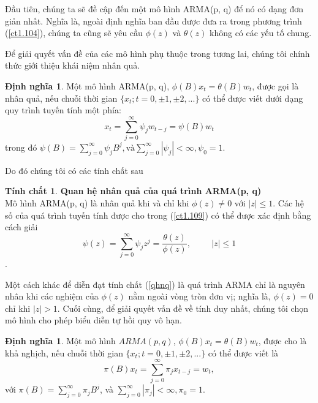\documentclass[12pt, a4paper,oneside]{book}
\theoremstyle{definition}
\newtheorem{dn}[theo]{Định nghĩa}
\newtheorem{tc}[theo]{Tính chất}
\begin{document}
Đầu tiên, chúng ta sẽ đề cập đến một mô hình ARMA(p, q) để nó có dạng đơn giản nhất. Nghĩa là, ngoài định nghĩa ban đầu được đưa ra trong phương trình (\ref{ct1.104}), chúng ta cũng sẽ yêu cầu $\phi(z)$ và $\theta(z)$ không có các yếu tố chung.
	
Để giải quyết vấn đề của các mô hình phụ thuộc trong tương lai, chúng tôi chính thức giới thiệu khái niệm nhân quả.

\begin{dn}
Một mô hình ARMA(p, q), $\phi(B)x_{t} = \theta(B)w_{t}$, được gọi là nhân quả, nếu chuỗi thời gian $\{x_{t}; t = 0, \pm 1, \pm 2, ...\}$ có thể được viết dưới dạng quy trình tuyến tính một phía:
\begin{equation}
x_{t}= \sum_{j=0}^{\infty}\psi_{j}w_{t-j}= \psi(B)w_{t} \label{ct1.109}
\end{equation}	
trong đó $\psi(B)= \sum_{j=0}^{\infty}\psi_{j}B^{j}, \text{và} \sum_{j=0}^{\infty}|\psi_{j}|< \infty, \psi_{0}=1$.
\end{dn}
Do đó chúng tôi có các tính chất sau 

\begin{tc}\textbf{\label{qhnq}Quan hệ nhân quả của quá trình ARMA(p, q)}\\
Mô hình ARMA(p, q) là nhân quả khi và chỉ khi $\phi(z) \neq 0$ với $|z| \leq1$. Các hệ số của quá trình tuyến tính được cho trong (\ref{ct1.109}) có thể được xác định bằng cách giải
$$\psi(z)= \sum_{j=0}^{\infty}\psi_{j}z^{j}= \dfrac{\theta(z)}{\phi(z)}, \hspace{1cm} |z|\leq1$$.
\end{tc}

Một cách khác để diễn đạt tính chất (\ref{qhnq}) là quá trình ARMA chỉ là nguyên nhân khi các nghiệm của $\phi(z)$ nằm ngoài vòng tròn đơn vị; nghĩa là, $\phi(z) = 0$ chỉ khi $| z | > 1$. Cuối cùng, để giải quyết vấn đề về tính duy nhất, chúng tôi chọn mô hình cho phép biểu diễn tự hồi quy vô hạn.

\begin{dn}
Một mô hình $ARMA(p, q)$, $\phi(B)x_{t} = \theta(B)w_{t}$, được cho là khả nghịch, nếu chuỗi thời gian $\{x_{t}; t = 0, \pm 1, \pm2, ...\}$ có thể được viết là 
\begin{equation}
\pi(B)x_{t}= \sum_{j=0}^{\infty}\pi_{j}x_{t-j} = w_{t}, \label{ct1.111}
\end{equation}	
với $\pi(B)= \sum_{j=0}^{\infty}\pi_{j}B^{j}$, và $\sum_{j=0}^{\infty}|\pi_{j}| < \infty, \pi_{0}=1$.
\end{dn}
\end{document}
